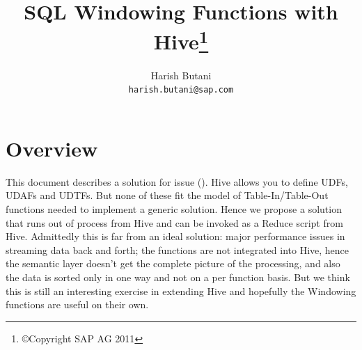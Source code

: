 \documentclass[pdftex,10pt,a4paper]{article}
\begin{document}
  \title{SQL Windowing Functions with Hive\footnote{\copyright Copyright SAP AG 2011}}
  \author{Harish Butani \\
  \texttt{harish.butani@sap.com}}
  \maketitle

  \section{Overview}
This document describes a solution for issue (\cite{hive1}). Hive allows you to define UDFs, UDAFs and UDTFs. But none of these fit the model of Table-In/Table-Out functions needed to implement a generic solution. Hence we propose a solution that runs out of process from Hive and can be invoked as a Reduce script from Hive.  Admittedly this is far from an ideal solution: major performance issues in streaming  data back and forth; the functions are not integrated into Hive, hence the semantic layer doesn't get the complete picture of the processing, and also the data is sorted only in one way and not on a per function basis. But we think this is still an interesting exercise in extending Hive and hopefully the Windowing functions are useful on their own.
\end{document}
